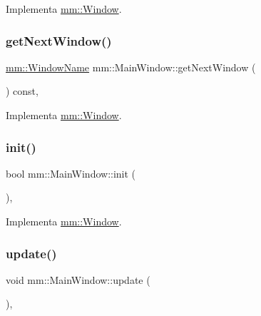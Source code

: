 Implementa \mbox{\hyperlink{classmm_1_1_window_a942c9125bf42156a9f7b7f561e412fed}{mm\+::\+Window}}.

\mbox{\label{classmm_1_1_main_window_aa1511ad7bed8d47cd35415d0a3a1161e}} 
\subsubsection{\texorpdfstring{get\+Next\+Window()}{getNextWindow()}}
{\footnotesize\ttfamily \mbox{\hyperlink{namespacemm_a4e9d92e04f65dbf2fc1963947da0d93c}{mm\+::\+Window\+Name}} mm\+::\+Main\+Window\+::get\+Next\+Window (\begin{DoxyParamCaption}{ }\end{DoxyParamCaption}) const\hspace{0.3cm}{\ttfamily [override]}, {\ttfamily [virtual]}}



Implementa \mbox{\hyperlink{classmm_1_1_window_a0cd7b4b0feb9505c44503547a161fcd8}{mm\+::\+Window}}.

\mbox{\label{classmm_1_1_main_window_a1094273a8ac991a50e4612efa8174fdd}} 
\subsubsection{\texorpdfstring{init()}{init()}}
{\footnotesize\ttfamily bool mm\+::\+Main\+Window\+::init (\begin{DoxyParamCaption}{ }\end{DoxyParamCaption})\hspace{0.3cm}{\ttfamily [override]}, {\ttfamily [virtual]}}



Implementa \mbox{\hyperlink{classmm_1_1_window_aba03fbf4761b2f106352baecf5996e10}{mm\+::\+Window}}.

\mbox{\label{classmm_1_1_main_window_ac0fc4875dc774c1b7b1ca59d174a7fc1}} 
\subsubsection{\texorpdfstring{update()}{update()}}
{\footnotesize\ttfamily void mm\+::\+Main\+Window\+::update (\begin{DoxyParamCaption}{ }\end{DoxyParamCaption})\hspace{0.3cm}{\ttfamily [override]}, {\ttfamily [virtual]}}



